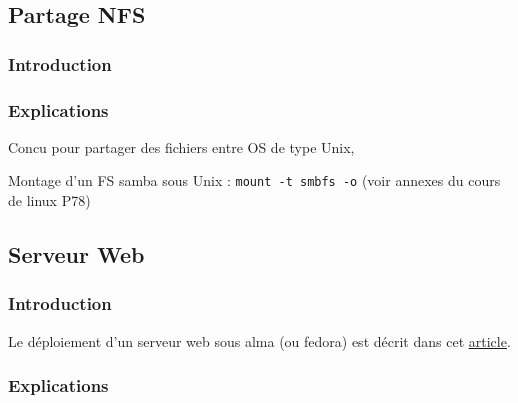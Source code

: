 \documentclass{article}
\begin{document}
	\subsection{Partage NFS}
	\subsubsection{Introduction}

	\subsubsection{Explications}
	Concu pour partager des fichiers entre OS de type Unix, 
	
	Montage d'un FS samba sous Unix :
	\texttt{mount -t smbfs -o} (voir annexes du cours de linux P78)
	
	\newpage
	
	
	
	
	
	
	
	
	
	
	\subsection{Serveur Web}
	\subsubsection{Introduction}
	Le déploiement d'un serveur web sous alma (ou fedora) est décrit dans cet \href{https://docs.fedoraproject.org/en-US/fedora-server/services/httpd-basic-setup/}{\underline{article}}.
	
	\subsubsection{Explications}	
		
\end{document}
